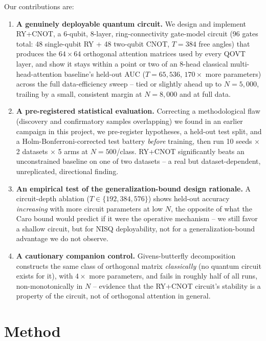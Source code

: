 \documentclass[10pt,letterpaper]{article}
\theoremstyle{plain}
\theoremstyle{definition}
\begin{document}
Our contributions are:
\begin{enumerate}
\item \textbf{A genuinely deployable quantum circuit.} We design and
  implement RY+CNOT, a 6-qubit, 8-layer, ring-connectivity gate-model
  circuit (96 gates total: 48 single-qubit RY + 48 two-qubit CNOT,
  $T{=}384$ free angles) that
  produces the $64{\times}64$ orthogonal attention matrices used by every
  QOVT layer, and show it stays within a point or two of an 8-head
  classical multi-head-attention baseline's held-out AUC ($T{=}65{,}536$,
  $170\times$ more parameters) across the full data-efficiency sweep --
  tied or slightly ahead up to $N{=}5{,}000$, trailing by a small,
  consistent margin at $N{=}8{,}000$ and at full data.
\item \textbf{A pre-registered statistical evaluation.} Correcting a
  methodological flaw (discovery and confirmatory samples overlapping) we
  found in an earlier campaign in this project, we pre-register hypotheses,
  a held-out test split, and a Holm-Bonferroni-corrected test battery
  \emph{before} training, then run 10 seeds $\times$ 2 datasets $\times$
  5 arms at $N{=}500$/class. RY+CNOT significantly beats an unconstrained
  baseline on one of two datasets -- a real but dataset-dependent,
  unreplicated, directional finding.
\item \textbf{An empirical test of the generalization-bound design
  rationale.} A circuit-depth ablation ($T\in\{192,384,576\}$) shows
  held-out accuracy \emph{increasing} with more circuit parameters at low
  $N$, the opposite of what the Caro bound would predict if it were the
  operative mechanism -- we still favor a shallow circuit, but for NISQ
  deployability, not for a generalization-bound advantage we do not observe.
\item \textbf{A cautionary companion control.} Givens-butterfly
  decomposition constructs the same class of orthogonal matrix
  \emph{classically} (no quantum circuit exists for it), with $4\times$
  more parameters, and fails in roughly half of all runs, non-monotonically
  in $N$ -- evidence that the RY+CNOT circuit's stability is a property of
  the circuit, not of orthogonal attention in general.
\end{enumerate}

\section{Method}
\end{document}
